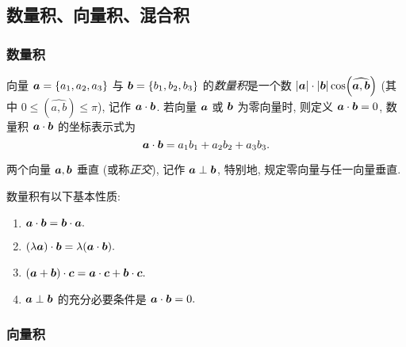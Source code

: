 \subsection{数量积、向量积、混合积}

\subsubsection{数量积}

\begin{definition}
    向量 $ \vb*{a}=\left\{a_{1}, a_{2}, a_{3}\right\} $ 与 $ \vb*{b}=\left\{b_{1}, b_{2}, b_{3}\right\} $ 的\textit{数量积}是一个数 $ |\vb*{a}| \cdot|\vb*{b}| \cos (\widehat{\vb*{a}, \vb*{b}}) $ (其中 $ 0 \leqslant(\widehat{a, b}) \leqslant \pi$),
    记作 $ \vb*{a} \cdot \vb*{b} $. 若向量 $ \vb*{a} $ 或 $ \vb*{b} $ 为零向量时, 则定义 $ \vb*{a} \cdot \vb*{b}=0$, 数量积 $ \vb*{a} \cdot \vb*{b} $ 的坐标表示式为
    $$\vb*{a} \cdot \vb*{b}=a_{1} b_{1}+a_{2} b_{2}+a_{3} b_{3} .$$
\end{definition}

\begin{definition}[向量正交]
    两个向量 $ \vb*{a}, \vb*{b} $ 垂直 (或称\textit{正交}), 记作 $ \vb*{a} \perp \vb*{b} $, 特别地, 规定零向量与任一向量垂直.
\end{definition}

数量积有以下基本性质:
\begin{enumerate}[label=(\arabic{*})]
    \item $\vb*{a} \cdot \vb*{b}=\vb*{b} \cdot \vb*{a} .$
    \item  $(\lambda \vb*{a}) \cdot \vb*{b}=\lambda(\vb*{a} \cdot \vb*{b}) .$
    \item $(\vb*{a}+\vb*{b}) \cdot \vb*{c}=\vb*{a} \cdot \vb*{c}+\vb*{b} \cdot \vb*{c} .$
    \item $\vb*{a} \perp \vb*{b} $ 的充分必要条件是 $ \vb*{a} \cdot \vb*{b}=0 .$
\end{enumerate}

\subsubsection{向量积}

